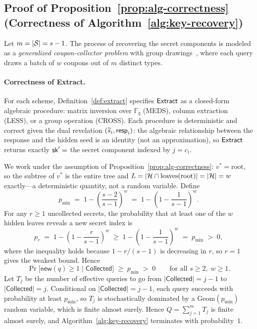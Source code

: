 \subsection{Proof of Proposition~\ref{prop:alg-correctness}
  (Correctness of Algorithm~\ref{alg:key-recovery})}
\label{app:proof-recovery}

Let $m = |\mathcal{S}| = s - 1$. The process of recovering the secret
components is modeled as a \emph{generalized coupon-collector problem}
with group drawings~\cite{coupon1,AnceaumeBSS16}, where each query
draws a batch of $w$ coupons out of $m$ distinct types.

\paragraph{Correctness of Extract.}
For each scheme, Definition~\ref{def:extract} specifies $\mathsf{Extract}$ as a closed-form
algebraic procedure: matrix inversion over $\mathbb{F}_q$ (MEDS), column extraction
(LESS), or a group operation (CROSS).
Each procedure is deterministic and correct given the dual revelation
$(\widetilde{s}_i, \mathsf{resp}_i)$: the algebraic relationship between the response and the
hidden seed is an identity (not an approximation), so $\mathsf{Extract}$ returns exactly
$\mathsf{sk}' = $ the secret component indexed by $j = c_i$.

We work under the assumption of Proposition~\ref{prop:alg-correctness}:
$v^* = \mathrm{root}$, so the subtree of $v^*$ is the entire tree and
$L = |\mathcal{H} \cap \mathrm{leaves}(\mathrm{root})| = |\mathcal{H}| = w$
exactly---a deterministic quantity, not a random variable.
Define
\[
  p_{\min}
  \;=\; 1 - \left(\frac{s-2}{s-1}\right)^{\!w}
  \;=\; 1 - \left(1 - \frac{1}{s-1}\right)^{\!w}.
\]
For any $r \geq 1$ uncollected secrets, the probability that at least one of
the $w$ hidden leaves reveals a new secret index is
\[
  p_r
  \;=\; 1 - \left(1 - \frac{r}{s-1}\right)^{\!w}
  \;\geq\; 1 - \left(1 - \frac{1}{s-1}\right)^{\!w}
  \;=\; p_{\min}
  \;>\; 0,
\]
where the inequality holds because $1 - r/(s-1)$ is decreasing in $r$, so
$r = 1$ gives the weakest bound.  Hence
\[
  \Pr\bigl[\mathsf{new}(q) \geq 1 \;\big|\; \mathsf{Collected}\bigr]
  \;\geq\; p_{\min} \;>\; 0
  \qquad \text{for all } s \geq 2,\; w \geq 1.
\]
Let $T_j$ be the number of effective queries to go from
$|\mathsf{Collected}| = j-1$ to $|\mathsf{Collected}| = j$.
Conditional on $|\mathsf{Collected}| = j-1$, each query succeeds with
probability at least $p_{\min}$, so $T_j$ is stochastically dominated by
a $\mathrm{Geom}(p_{\min})$ random variable, which is finite almost
surely.  Hence $Q = \sum_{j=1}^{m} T_j$ is finite almost surely, and
Algorithm~\ref{alg:key-recovery} terminates with probability~$1$.


